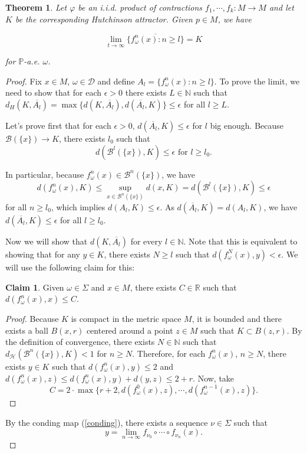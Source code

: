 \documentclass[a4paper]{article}
\theoremstyle{plain}
\newtheorem{theorem}{Theorem}[section] %
\theoremstyle{definition}
\newtheorem*{claim*}{Claim}
\newcommand{\PP}{\mathbb{P}}
\begin{document}
\begin{theorem}
    Let $\varphi$ be an i.i.d. product of contractions $f_1, \cdots, f_k:M\rightarrow M$ and let $K$ be the corresponding Hutchinson attractor. Given $p\in M$, we have 

    $$\lim_{t\to\infty}\overline{\{f_\omega^n(x):n\geq l\}} = K$$

    for $\PP$-a.e. $\omega$.
\end{theorem}

\begin{proof}
     Fix $x\in M$, $\omega\in\mathcal D$ and define $A_l = \{f_\omega^n(x):n\geq l\}$. To prove the limit, we need to show that for each $\epsilon > 0$ there exists $L\in\mathbb N$ such that $d_H(K, \overline{A_l})=\max\{d(K, \overline{A_l}), d(\overline{A_l}, K)\}\leq\epsilon$ for all $l\geq L$.
 
      Let's prove first that for each $\epsilon>0$, $d(\overline{A_l}, K)\leq\epsilon$ for $l$ big enough. Because $\mathcal B(\{x\})\to K$,  there exists $l_0$ such that 
     $$d(\mathcal B^l(\{x\}), K)\leq\epsilon\text{ for }l\geq l_0.$$

     In particular, because $f_\omega^n(x)\in\mathcal B^n(\{x\})$, we have
     $$d(f_\omega^n(x), K)\leq\sup_{x\in\mathcal B^n(\{x\})} d(x, K)=d(\mathcal B^l(\{x\}), K)\leq\epsilon$$
     for all $n\geq l_0$, which implies $d(A_l, K)\leq\epsilon$. As $d(\overline{A_l}, K)=d(A_l, K)$, we have $d(\overline{A_l}, K)\leq\epsilon$ for all $l\geq l_0$.

     Now we will show that $d(K, \overline{A_l})$ for every $l\in\mathbb N$. Note that this is equivalent to showing that for any $y\in K$, there exists $N\geq l$ such that $d(f_\omega^N(x), y)<\epsilon$. We will use the following claim for this:

     \begin{claim*}
         Given $\omega\in\Sigma$ and $x\in M$, there exists $C\in\mathbb R$ such that $d(f_\omega^n(x), x)\leq C$.
     \end{claim*}
     \begin{proof}
         Because $K$ is compact in the metric space $M$, it is bounded and there exists a ball $B(x, r)$ centered around a point $z\in M$ such that $K\subset B(z, r)$. By the definition of convergence, there exists $N\in\mathbb N$ such that $d_\mathcal H(\mathcal B^n(\{x\}),K)<1$ for $n\geq N$. Therefore, for each $f_\omega^n(x)$, $n\geq N$, there exists $y\in K$ such that $d(f_\omega^n(x), y)\leq 2$ and $d(f_\omega^n(x), z)\leq d(f_\omega^n(x), y)+d(y, z)\leq 2+r$. Now, take $$C=2\cdot\max\{r+2, d(f_\omega^0(x), z), \cdots, d(f_\omega^{n-1}(x), z)\}.$$
     \end{proof}
     By the conding map (\ref{conding}), there exists a sequence $\nu\in\Sigma$ such that
     $$y = \lim_{n\to\infty} f_{\nu_0}\circ\cdots\circ f_{\nu_n}(x).$$


\end{proof}
\end{document}
